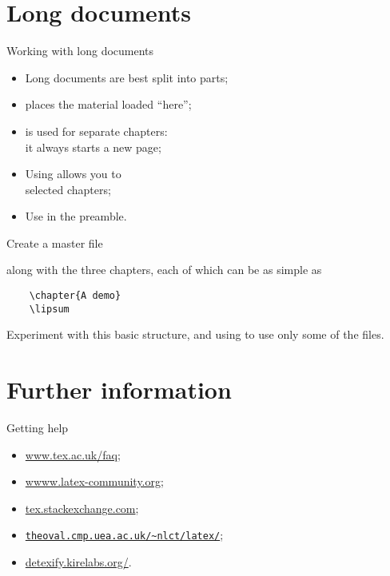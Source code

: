 \section{Long documents}

\begin{frame}{Working with long documents}

  \begin{itemize}
    \item Long documents are best split into parts;
    \item {} places the material loaded \enquote{here};
    \item {} is used for separate chapters:\\ it always starts
      a new page;
    \item Using  allows you to \\
      selected chapters;
    \item Use  in the preamble.
  \end{itemize}
  
\end{frame}

\begin{exercise}

  Create a master file
  
  along with the three chapters, each of which can be as simple as
  \begin{verbatim}
    \chapter{A demo}
    \lipsum
  \end{verbatim}
  Experiment with this basic structure, and using  to
  use only some of the files.

\end{exercise}


\section{Further information}

\begin{frame}{Getting help}

  \begin{itemize}
    \item \url{www.tex.ac.uk/faq};
    \item \url{wwww.latex-community.org};
    \item \url{tex.stackexchange.com};
    \item \href{theoval.cmp.uea.ac.uk/~nlct/latex/}
      {\texttt{theoval.cmp.uea.ac.uk/\textasciitilde nlct/latex/}};
    \item \url{detexify.kirelabs.org/}.
  \end{itemize}

\end{frame}

